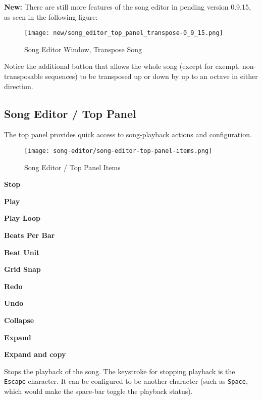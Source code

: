    \textbf{New:}
   There are still more features of the song editor in
   pending version 0.9.15, as seen in the following
   figure:

\begin{figure}[H]
   \centering 
   \texttt{[image: new/song\_editor\_top\_panel\_transpose-0\_9\_15.png]}
   \caption{Song Editor Window, Transpose Song}
   \label{fig:song_editor_window_transpose_song}
\end{figure}

   Notice the additional button that allows the whole song (except for
   exempt, non-transposable sequences) to be transposed up or down by up to an
   octave in either direction.

\subsection{Song Editor / Top Panel}
\label{subsec:seq64_song_editor_top}

   The top panel provides quick access to song-playback actions and
   configuration.

\begin{figure}[H]
   \centering 
   \texttt{[image: song-editor/song-editor-top-panel-items.png]}
   \caption{Song Editor / Top Panel Items}
   \label{fig:song_editor_top_panel_items}
\end{figure}

   \begin{enumber}
      \item \textbf{Stop}
      \item \textbf{Play}
      \item \textbf{Play Loop}
      \item \textbf{Beats Per Bar}
      \item \textbf{Beat Unit}
      \item \textbf{Grid Snap}
      \item \textbf{Redo}
      \item \textbf{Undo}
      \item \textbf{Collapse}
      \item \textbf{Expand}
      \item \textbf{Expand and copy}
   \end{enumber}

   \setcounter{ItemCounter}{0}      %

   Stops the playback of the song.
   The keystroke for stopping playback is the \texttt{Escape} character.
   It can be configured to be another character (such as \texttt{Space}, which
   would make the space-bar toggle the playback status).

